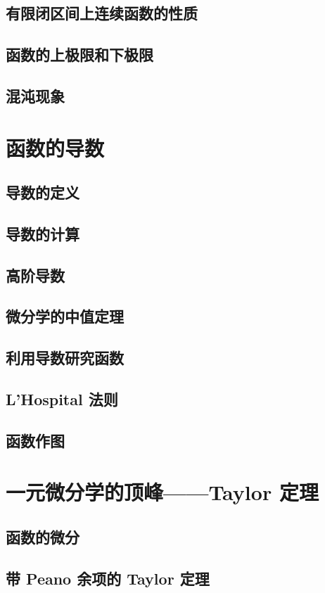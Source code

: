 \documentclass[a4paper, 11pt]{ctexbook}
\begin{document}
        \section{有限闭区间上连续函数的性质}
        \section{函数的上极限和下极限}
        \section{混沌现象}
    \chapter{函数的导数}
        \section{导数的定义}
        \section{导数的计算}
        \section{高阶导数}
        \section{微分学的中值定理}
        \section{利用导数研究函数}
        \section{L'Hospital 法则}
        \section{函数作图}
    \chapter{一元微分学的顶峰——Taylor 定理}
        \section{函数的微分}
            
        \section{带 Peano 余项的 Taylor 定理}
            
\end{document}

